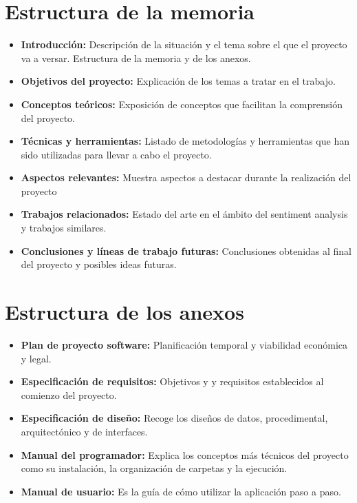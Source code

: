 \section{Estructura de la memoria}
\begin{itemize}
\tightlist
    \item
        \textbf{Introducción: }Descripción de la situación y el tema sobre el que el proyecto va a versar. Estructura de la memoria y de los anexos.
    \item 
        \textbf{Objetivos del proyecto: }Explicación de los temas a tratar en el trabajo.
    \item 
        \textbf{Conceptos teóricos: }Exposición de conceptos que facilitan la comprensión del proyecto.
    \item 
        \textbf{Técnicas y herramientas: }Listado de metodologías y herramientas que han sido utilizadas para llevar a cabo el proyecto. 
    \item 
        \textbf{Aspectos relevantes: }Muestra aspectos a destacar durante la realización del proyecto
    \item 
        \textbf{Trabajos relacionados: }Estado del arte en el ámbito del sentiment analysis y trabajos similares.
    \item 
        \textbf{Conclusiones y líneas de trabajo futuras: }Conclusiones obtenidas al final del proyecto y posibles ideas futuras.
\end{itemize}

\newpage
\section{Estructura de los anexos}
\begin{itemize}
\tightlist
    \item 
        \textbf{Plan de proyecto software: }Planificación temporal y viabilidad económica y legal.
    \item 
        \textbf{Especificación de requisitos: }Objetivos y y requisitos establecidos al comienzo del proyecto.
    \item 
        \textbf{Especificación de diseño: }Recoge los diseños de datos, procedimental, arquitectónico y de interfaces.
    \item 
        \textbf{Manual del programador: }Explica los conceptos más técnicos del proyecto como su instalación, la organización de carpetas y la ejecución.
    \item 
        \textbf{Manual de usuario: }Es la guía de cómo utilizar la aplicación paso a paso.
\end{itemize}